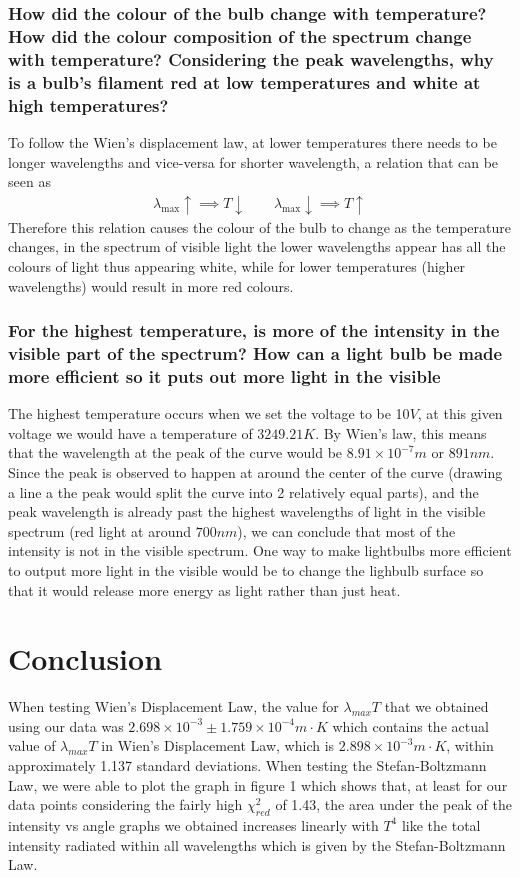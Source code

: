 \documentclass{article}
\begin{document}
\newpage
\subsubsection*{How did the colour of the bulb change with temperature? How did
the colour composition of the spectrum change with temperature? Considering the
peak wavelengths, why is a bulb's filament red at low temperatures and white at
high temperatures?}
To follow the Wien's displacement law, at lower temperatures there needs to be
longer wavelengths and vice-versa for shorter wavelength, a relation that can be
seen as 
\begin{align*}
    \lambda_{\max}\uparrow \implies T\downarrow \ \ \ \ \ \ \ \ \ 
    \lambda_{\max}\downarrow \implies T\uparrow
\end{align*}
Therefore this relation causes the colour of the bulb to change as the temperature
changes, in the spectrum of visible light the lower wavelengths appear has
all the colours of light thus appearing white, while for lower temperatures 
(higher wavelengths) would result in more red colours.

\newpage

\subsubsection*{For the highest temperature, is more of the intensity in the visible
part of the spectrum? How can a light bulb be made more efficient so it puts
out more light in the visible}
The highest temperature occurs when we set the voltage to be 10$V$, at this given
voltage we would have a temperature of $3249.21 K$. By Wien's law, this means that
the wavelength at the peak of the curve would be $8.91\times10^{-7}m$ or $891nm$.
Since the peak is observed to happen at around the center of the curve (drawing
a line a the peak would split the curve into 2 relatively equal parts), and the
peak wavelength is already past the highest wavelengths of light in the visible
spectrum (red light at around $700 nm$), we can conclude that most of the intensity
is not in the visible spectrum. One way to make lightbulbs more efficient to output
more light in the visible would be to change the lighbulb surface so that it would
release more energy as light rather than just heat.

\section{Conclusion}
When testing Wien's Displacement Law, the value for $\lambda_{max}T$ that we obtained 
using our data was $2.698 \times 10^{-3} \pm 1.759 \times 10^{-4} m\cdot K$ which contains 
the actual value of $\lambda_{max}T$ in Wien's Displacement Law, which is $2.898 \times 
10^{-3} m\cdot K$, within approximately 1.137 standard deviations.  When testing the 
Stefan-Boltzmann Law, we were able to plot the graph in figure 1 which shows that, at least 
for our data points considering the fairly high $\chi^2_{red}$ of 1.43, the area under 
the peak of the intensity vs angle graphs we obtained increases linearly with $T^4$ like 
the total intensity radiated within all wavelengths which is given by the Stefan-Boltzmann Law.
\end{document}
